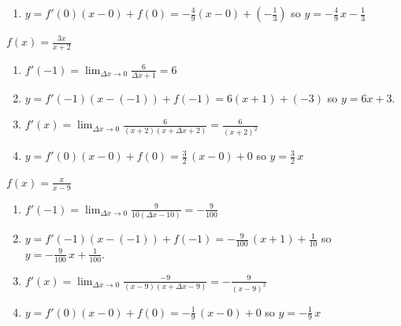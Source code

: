 \documentclass{ximera}
\begin{document}
\begin{question}
\begin{problem}
\begin{solution}
\begin{enumerate}
\item $y = f'(0)(x-0)+f(0) = -\frac{4}{9} (x-0) + \left(-\frac{1}{3}\right)$ so $y = -\frac{4}{9} \, x - \frac{1}{3}$

\end{enumerate}

\end{solution}
\end{problem}

\begin{problem}
 $f(x) = \frac{3x}{x+2}$

 \begin{solution}
\begin{enumerate}

\item  $f'(-1) = \lim_{\Delta x \rightarrow 0} \frac{6}{\Delta x + 1}= 6$

\item $y = f'(-1)(x-(-1)) + f(-1) = 6(x+1) + (-3)$ so $y = 6x+3$.

\item  $f'(x) =\lim_{\Delta x \rightarrow 0} \frac{6}{(x+2)(x+\Delta x+2)} =   \frac{6}{(x+2)^2}$   

\item  $y = f'(0)(x-0) + f(0) = \frac{3}{2} \, (x-0)+0$ so $y = \frac{3}{2} \, x$

\end{enumerate}
 \end{solution}
 \end{problem}

\begin{problem}
$f(x) = \frac{x}{x - 9}$

\begin{solution}
\begin{enumerate}

\item  $f'(-1) = \lim_{\Delta x \rightarrow 0} \frac{9}{10(\Delta x - 10)} = -\frac{9}{100}$

\item $y = f'(-1)(x-(-1)) + f(-1) = -\frac{9}{100} \, (x+1) + \frac{1}{10}$ so $y = - \frac{9}{100} \, x + \frac{1}{100}$.


\item  $f'(x) =\lim_{\Delta x \rightarrow 0} \frac{-9}{(x - 9)(x + \Delta x - 9)} =   -\frac{9}{(x-9)^2}$    

\item  $y = f'(0)(x-0) + f(0) = -\frac{1}{9} \, (x-0)+0$ so $y = -\frac{1}{9} \, x$

\end{enumerate}
\end{solution}
\end{problem}


\end{question}
\end{document}
